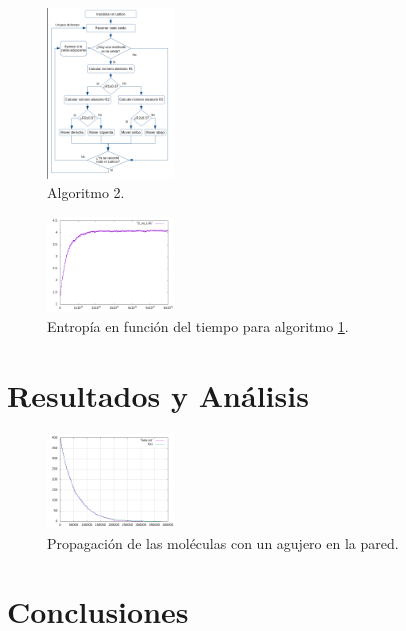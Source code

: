 \documentclass[12pt,twocolumn]{article}
\begin{document}
\begin{figure}
    \centering
    \includegraphics[width=0.3\textwidth]{figs/Algoritmo_OOP.png}
    \caption{Algoritmo 2.}
    \label{fig:algoritmo_OOP}
\end{figure}


\begin{figure}
    \centering
    \includegraphics[width=0.3\textwidth]{figs/S_vs_t_OOP_all.png}
    \caption{Entropía en función del tiempo para algoritmo \ref{fig:algoritmo_OOP}.}
    \label{fig:s_vs_t}
\end{figure}

\section{Resultados y Análisis}

\begin{figure}
    \centering
    \includegraphics[width=0.3\textwidth]{figs/hole.png}
    \caption{Propagación de las moléculas con un agujero en la pared.}
    \label{fig:hole}
\end{figure}




\section{Conclusiones}
\end{document}
